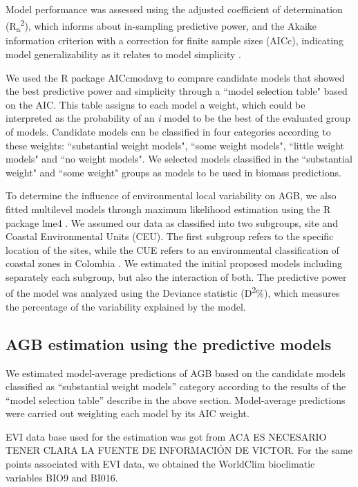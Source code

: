 \documentclass[review, authoryear]{elsarticle}   	%
\begin{document}
Model performance was assessed using the adjusted coefficient of determination (R\textsubscript{a}\textsuperscript{2}), which informs about in-sampling predictive power, and the Akaike information criterion with a correction for finite sample sizes (AICc), indicating model generalizability as it relates to model simplicity \citep{1748-9326-9-10-104013}.

We used the R package AICcmodavg \citep{Mazerolle:2015aa} to compare candidate models that showed the best predictive power and simplicity through a ``model selection table" based on the AIC. This table assigns to each model a weight, which could be interpreted as the probability of an  \emph{i} model to be the best of the evaluated group of models. %
Candidate models can be classified in four categories according to these weights: ``substantial weight models", ``some weight models", ``little weight models" and ``no weight models". We selected models classified in the ``substantial weight"  and ``some weight" groups as models to be used in biomass predictions.  

To determine the influence of environmental local variability on AGB, we also fitted multilevel models through maximum likelihood estimation using the R package lme4 \citep{Bates:2015aa}. We assumed our data as classified into two subgroups, site and Coastal Environmental Units (CEU). The first subgroup refers to the specific location of the sites, while the CUE refers to an environmental classification of coastal zones in Colombia \citep{CCO_UAC}. We estimated the initial proposed models including separately each subgroup, but also the interaction of both. The predictive power of the model was analyzed using the Deviance statistic (D\textsuperscript{2}\%), which measures the percentage of the variability explained by the model. 

\subsection {AGB estimation using the predictive models}
We estimated model-average predictions of AGB based on the candidate models classified as ``substantial weight models'' category according to the results of the ``model selection table'' describe in the above section. Model-average predictions were carried out weighting each model by its AIC weight. 

 EVI data base used for the estimation was got from ACA ES NECESARIO TENER CLARA LA FUENTE DE INFORMACIÓN DE VICTOR. For the same points associated with EVI data, we obtained the WorldClim bioclimatic variables BIO9 and BI016.
\end{document}
